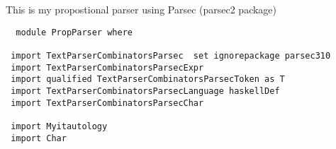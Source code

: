 \documentclass{article}
\begin{document}
This is my propostional parser using Parsec (parsec2 package)

\begin{tabbing}\tt
~module~PropParser~where\\
\tt ~\\
\tt ~import~TextParserCombinatorsParsec~~set~ignorepackage~parsec310\\
\tt ~import~TextParserCombinatorsParsecExpr\\
\tt ~import~qualified~TextParserCombinatorsParsecToken~as~T\\
\tt ~import~TextParserCombinatorsParsecLanguage~haskellDef\\
\tt ~import~TextParserCombinatorsParsecChar\\
\tt ~\\
\tt ~import~Myitautology\\
\tt ~import~Char
\end{tabbing}
\end{document}
